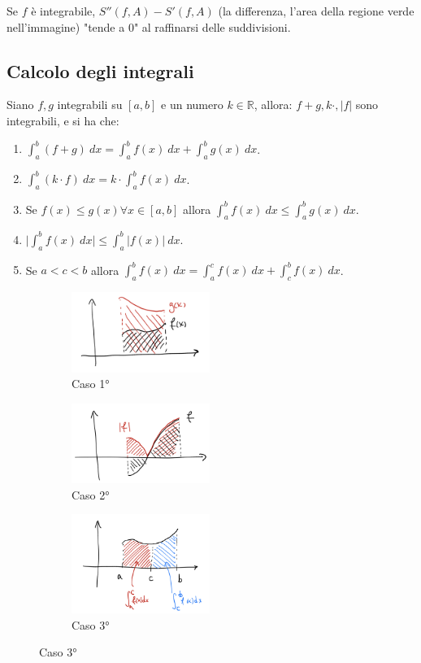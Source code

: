 Se $f$ è integrabile, $S''(f,A) - S'(f,A)$ (la differenza, l'area della regione verde nell'immagine) "tende a 0" al raffinarsi delle suddivisioni.
\vspace{15pt}
\subsection{Calcolo degli integrali}
\begin{theorem}
Siano $f,g$ integrabili su $[a,b]$ e un numero $k \in \mathbb{R}$, allora: $f+g, k\cdot, |f|$ sono integrabili, e si ha che:
\begin{enumerate}
    \item $\int_a^b (f+g)\:dx = \int_a^b f(x)\:dx + \int_a^b g(x)\:dx$.
    \item $\int_a^b (k\cdot f)\:dx = k \cdot \int_a^b f(x) \:dx$.
    \item Se $f(x) \leq g(x) \forall x \in [a,b]$ allora $\int_a^b f(x) \:dx \leq \int_a^b g(x)\:dx$.
    \item $\big|\int_a^b f(x) \:dx \big| \leq \int_a^b |f(x)|\:dx$.
    \item Se $a < c < b$ allora $\int_a^b f(x) \:dx = \int_a^c f(x) \:dx + \int_c^b f(x)\:dx$.
\end{enumerate}
\end{theorem}

\newpage
\begin{figure}[h!]
    \centering
    \begin{subfigure}{.3\textwidth}
        \centering
        \includegraphics[width=4.5cm]{images/teorema-calcolo-integrali-1.png}
        \caption{Caso 1°}
    \end{subfigure}
    \begin{subfigure}{.3\textwidth}
        \centering
        \includegraphics[width=4.5cm]{images/teorema-calcolo-integrali-2.png} 
        \caption{Caso 2°}
    \end{subfigure}
    \begin{subfigure}{.3\textwidth}
        \centering
        \includegraphics[width=4.5cm]{images/teorema-calcolo-integrali-3.png}
        \caption{Caso 3°}
    \end{subfigure}
\end{figure}

